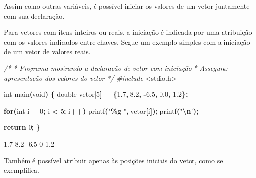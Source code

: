 \documentclass[
  11pt,
  a4paper,
]{scrbook}
\newenvironment{Shaded}{\begin{snugshade}}{\end{snugshade}}
\newcommand{\CommentTok}[1]{\textcolor[rgb]{0.56,0.35,0.01}{\textit{#1}}}
\newcommand{\ControlFlowTok}[1]{\textcolor[rgb]{0.13,0.29,0.53}{\textbf{#1}}}
\newcommand{\DataTypeTok}[1]{\textcolor[rgb]{0.13,0.29,0.53}{#1}}
\newcommand{\DecValTok}[1]{\textcolor[rgb]{0.00,0.00,0.81}{#1}}
\newcommand{\FloatTok}[1]{\textcolor[rgb]{0.00,0.00,0.81}{#1}}
\newcommand{\ImportTok}[1]{#1}
\newcommand{\NormalTok}[1]{#1}
\newcommand{\OperatorTok}[1]{\textcolor[rgb]{0.81,0.36,0.00}{\textbf{#1}}}
\newcommand{\PreprocessorTok}[1]{\textcolor[rgb]{0.56,0.35,0.01}{\textit{#1}}}
\newcommand{\SpecialCharTok}[1]{\textcolor[rgb]{0.81,0.36,0.00}{\textbf{#1}}}
\newcommand{\StringTok}[1]{\textcolor[rgb]{0.31,0.60,0.02}{#1}}
\begin{document}
Assim como outras variáveis, é possível iniciar os valores de um vetor
juntamente com sua declaração.

Para vetores com itens inteiros ou reais, a iniciação é indicada por uma
atribuição com os valores indicados entre chaves. Segue um exemplo
simples com a iniciação de um vetor de valores reais.

\begin{Shaded}
\begin{Highlighting}[]
\CommentTok{/*}
\CommentTok{ * Programa mostrando a declaração de vetor com iniciação}
\CommentTok{ * Assegura: apresentação dos valores do vetor}
\CommentTok{ */}
\PreprocessorTok{\#include }\ImportTok{\textless{}stdio.h\textgreater{}}

\DataTypeTok{int}\NormalTok{ main}\OperatorTok{(}\DataTypeTok{void}\OperatorTok{)} \OperatorTok{\{}
    \DataTypeTok{double}\NormalTok{ vetor}\OperatorTok{[}\DecValTok{5}\OperatorTok{]} \OperatorTok{=} \OperatorTok{\{}\FloatTok{1.7}\OperatorTok{,} \FloatTok{8.2}\OperatorTok{,} \OperatorTok{{-}}\FloatTok{6.5}\OperatorTok{,} \FloatTok{0.0}\OperatorTok{,} \FloatTok{1.2}\OperatorTok{\};}

    \ControlFlowTok{for}\OperatorTok{(}\DataTypeTok{int}\NormalTok{ i }\OperatorTok{=} \DecValTok{0}\OperatorTok{;}\NormalTok{ i }\OperatorTok{\textless{}} \DecValTok{5}\OperatorTok{;}\NormalTok{ i}\OperatorTok{++)}
\NormalTok{        printf}\OperatorTok{(}\StringTok{"}\SpecialCharTok{\%g}\StringTok{ "}\OperatorTok{,}\NormalTok{ vetor}\OperatorTok{[}\NormalTok{i}\OperatorTok{]);}
\NormalTok{    printf}\OperatorTok{(}\StringTok{"}\SpecialCharTok{\textbackslash{}n}\StringTok{"}\OperatorTok{);}

    \ControlFlowTok{return} \DecValTok{0}\OperatorTok{;}
\OperatorTok{\}}
\end{Highlighting}
\end{Shaded}

\begin{Shaded}
\begin{Highlighting}[]
\NormalTok{1.7 8.2 {-}6.5 0 1.2 }
\end{Highlighting}
\end{Shaded}

Também é possível atribuir apenas às posições iniciais do vetor, como se
exemplifica.
\end{document}
